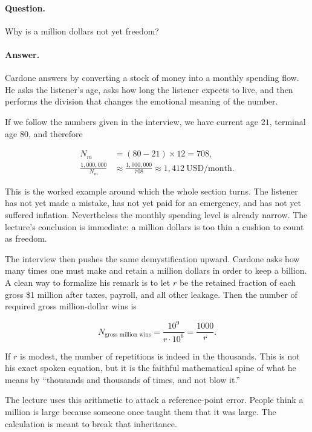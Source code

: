 \paragraph{Question.}
Why is a million dollars not yet freedom?

\paragraph{Answer.}
Cardone answers by converting a stock of money into a monthly spending flow. He asks the listener's age, asks how long the listener expects to live, and then performs the division that changes the emotional meaning of the number.

If we follow the numbers given in the interview, we have current age \(21\), terminal age \(80\), and therefore

\begin{align}
N_m &= (80-21)\times 12 = 708,\\
\frac{1{,}000{,}000}{N_m} &\approx \frac{1{,}000{,}000}{708} \approx 1{,}412\ \text{USD/month}.
\end{align}

This is the worked example around which the whole section turns. The listener has not yet made a mistake, has not yet paid for an emergency, and has not yet suffered inflation. Nevertheless the monthly spending level is already narrow. The lecture's conclusion is immediate: a million dollars is too thin a cushion to count as freedom.

The interview then pushes the same demystification upward. Cardone asks how many times one must make and retain a million dollars in order to keep a billion. A clean way to formalize his remark is to let \(r\) be the retained fraction of each gross \$1 million after taxes, payroll, and all other leakage. Then the number of required gross million-dollar wins is

\begin{equation}
N_{\text{gross million wins}}=\frac{10^9}{r\cdot 10^6}=\frac{1000}{r}.
\end{equation}

If \(r\) is modest, the number of repetitions is indeed in the thousands. This is not his exact spoken equation, but it is the faithful mathematical spine of what he means by ``thousands and thousands of times, and not blow it.''

The lecture uses this arithmetic to attack a reference-point error. People think a million is large because someone once taught them that it was large. The calculation is meant to break that inheritance.

